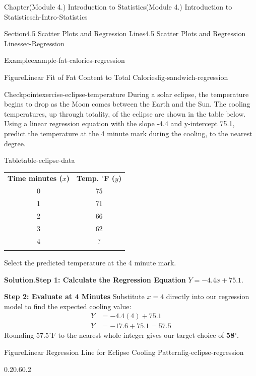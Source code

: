 \documentclass[oneside,10pt,]{book}
\newcommand{\blocktitlefont}{\relax}
\newcommand{\tabularfont}{\relax}
\newcommand{\terminology}[1]{\textbf{#1}}
\newcommand{\hrulethin}  {\noalign{\hrule height 0.04em}}
\newcommand{\amp}{&}
\begin{document}
\begin{chapterptx}{Chapter}{(Module 4.) Introduction to Statistics}{}{(Module 4.) Introduction to Statistics}{}{}{ch-Intro-Statistics}
\begin{sectionptx}{Section}{4.5 Scatter Plots and Regression Lines}{}{4.5 Scatter Plots and Regression Lines}{}{}{sec-Regression}
\begin{example}{Example}{}{example-fat-calories-regression}
\begin{figureptx}{Figure}{Linear Fit of Fat Content to Total Calories}{fig-sandwich-regression}{}
\tcblower
\end{figureptx}%
\end{example}
\begin{inlineexercise}{Checkpoint}{}{exercise-eclipse-temperature}%
During a solar eclipse, the temperature begins to drop as the Moon comes between the Earth and the Sun. The cooling temperatures, up through totality, of the eclipse are shown in the table below. Using a linear regression equation with the slope -4.4 and y-intercept 75.1, predict the temperature at the 4 minute mark during the cooling, to the nearest degree.%
\begin{tableptx}{Table}{\textbf{}}{table-eclipse-data}{}%
\centering%
{\tabularfont%
\begin{tabular}{cc}\hrulethin
{\bfseries{}\terminology{Time minutes (\(x\))}}&{\bfseries{}\terminology{Temp. \(^\circ\)F (\(y\))}}\tabularnewline\hrulethin
0&75\tabularnewline\hrulethin
1&71\tabularnewline\hrulethin
2&66\tabularnewline\hrulethin
3&62\tabularnewline\hrulethin
4&?\tabularnewline\hrulethin
\end{tabular}
}%
\end{tableptx}%
Select the predicted temperature at the 4 minute mark.%
\par\smallskip%
\noindent\textbf{\blocktitlefont Solution}.\hypertarget{exercise-eclipse-temperature-2}{}\quad{}\terminology{Step 1: Calculate the Regression Equation} \(Y = -4.4x + 75.1\).%
\par
\terminology{Step 2: Evaluate at 4 Minutes} Substitute \(x = 4\) directly into our regression model to find the expected cooling value:%
\begin{align*}
Y \amp = -4.4(4) + 75.1\\
Y \amp = -17.6 + 75.1 = 57.5
\end{align*}
Rounding \(57.5^\circ\text{F}\) to the nearest whole integer gives our target choice of \terminology{58\(^\circ\)}.%
\begin{figureptx}{Figure}{Linear Regression Line for Eclipse Cooling Pattern}{fig-eclipse-regression}{}%
\begin{image}{0.2}{0.6}{0.2}{}%
\end{image}
\end{figureptx}
\end{inlineexercise}
\end{sectionptx}
\end{chapterptx}
\end{document}
